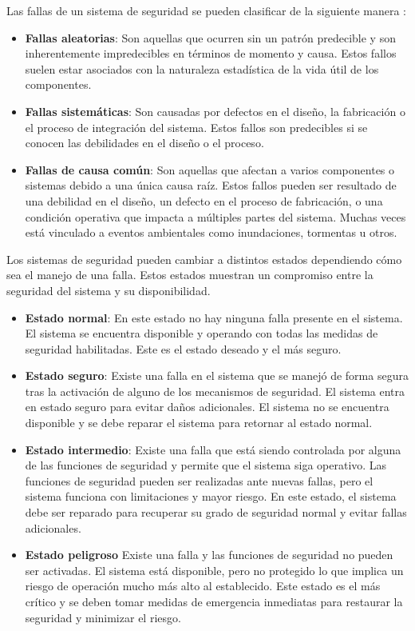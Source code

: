 Las fallas de un sistema de seguridad se pueden clasificar de la siguiente manera \cite{clasificacion_fallas}: 
\begin{itemize}
    \item \textbf{Fallas aleatorias}: Son aquellas que ocurren sin un patrón predecible y son inherentemente impredecibles en términos de momento y causa. Estos fallos suelen estar asociados con la naturaleza estadística de la vida útil de los componentes.
    \item \textbf{Fallas sistemáticas}: Son causadas por defectos en el diseño, la fabricación o el proceso de integración del sistema. Estos fallos son predecibles si se conocen las debilidades en el diseño o el proceso.
    \item \textbf{Fallas de causa común}: Son aquellas que afectan a varios componentes o sistemas debido a una única causa raíz. Estos fallos pueden ser resultado de una debilidad en el diseño, un defecto en el proceso de fabricación, o una condición operativa que impacta a múltiples partes del sistema. Muchas veces está vinculado a eventos ambientales como inundaciones, tormentas u otros. 
\end{itemize}

Los sistemas de seguridad pueden cambiar a distintos estados dependiendo cómo sea el manejo de una falla. Estos estados muestran un compromiso entre la seguridad del sistema y su disponibilidad. 

\begin{itemize}
    \item \textbf{Estado normal}: En este estado no hay ninguna falla presente en el sistema. El sistema se encuentra disponible y operando con todas las medidas de seguridad habilitadas. Este es el estado deseado y el más seguro. 
    \item \textbf{Estado seguro}: Existe una falla en el sistema que se manejó de forma segura tras la activación de alguno de los mecanismos de seguridad. El sistema entra en estado seguro para evitar daños adicionales. El sistema no se encuentra disponible y se debe reparar el sistema para retornar al estado normal. 
    \item \textbf{Estado intermedio}: Existe una falla que está siendo controlada por alguna de las funciones de seguridad y permite que el sistema siga operativo. Las funciones de seguridad pueden ser realizadas ante nuevas fallas, pero el sistema funciona con limitaciones y mayor riesgo. En este estado, el sistema debe ser reparado para recuperar su grado de seguridad normal y evitar fallas adicionales. 
    \item \textbf{Estado peligroso} Existe una falla y las funciones de seguridad no pueden ser activadas. El sistema está disponible, pero no protegido lo que implica un riesgo de operación mucho más alto al establecido. Este estado es el más crítico y se deben tomar medidas de emergencia inmediatas para restaurar la seguridad y minimizar el riesgo.
    
\end{itemize}




